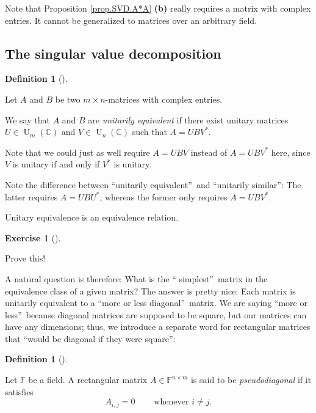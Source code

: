 \documentclass[numbers=enddot,12pt,final,onecolumn,notitlepage]{scrartcl}%
\newcounter{exer}
\numberwithin{exer}{subsection}
\theoremstyle{definition}
\newtheorem{defi}[theo]{Definition}
\newenvironment{definition}[1][]
{\begin{defi}[#1]\begin{leftbar}}
{\end{leftbar}\end{defi}}
\newtheorem{exmp}[exer]{Exercise}
\newenvironment{exercise}[1][]
{\begin{exmp}[#1]\begin{leftbar}}
{\end{leftbar}\end{exmp}}
\begin{document}
Note that Proposition \ref{prop.SVD.A*A} \textbf{(b)} really requires a matrix
with complex entries. It cannot be generalized to matrices over an arbitrary field.

\subsection{The singular value decomposition}

\begin{definition}
\label{def.svd.uniteq}Let $A$ and $B$ be two $m\times n$-matrices with complex entries.

We say that $A$ and $B$ are \emph{unitarily equivalent} if there exist unitary
matrices $U\in\operatorname*{U}\nolimits_{m}\left(  \mathbb{C}\right)  $ and
$V\in\operatorname*{U}\nolimits_{n}\left(  \mathbb{C}\right)  $ such that
$A=UBV^{\ast}$.
\end{definition}

Note that we could just as well require $A=UBV$ instead of $A=UBV^{\ast}$
here, since $V$ is unitary if and only if $V^{\ast}$ is unitary.

Note the difference between \textquotedblleft unitarily
equivalent\textquotedblright\ and \textquotedblleft unitarily
similar\textquotedblright: The latter requires $A=UBU^{\ast}$, whereas the
former only requires $A=UBV^{\ast}$.

Unitary equivalence is an equivalence relation.

\begin{exercise}
 Prove this!
\end{exercise}

A natural question is therefore: What is the \textquotedblleft
simplest\textquotedblright\ matrix in the equivalence class of a given matrix?
The answer is pretty nice: Each matrix is unitarily equivalent to a
\textquotedblleft more or less diagonal\textquotedblright\ matrix. We are
saying \textquotedblleft more or less\textquotedblright\ because diagonal
matrices are supposed to be square, but our matrices can have any dimensions;
thus, we introduce a separate word for rectangular matrices that
\textquotedblleft would be diagonal if they were square\textquotedblright:

\begin{definition}
Let $\mathbb{F}$ be a field. A rectangular matrix $A\in\mathbb{F}^{n\times m}$
is said to be \emph{pseudodiagonal} if it satisfies%
\[
A_{i,j}=0\ \ \ \ \ \ \ \ \ \ \text{whenever }i\neq j.
\]

\end{definition}
\end{document}

